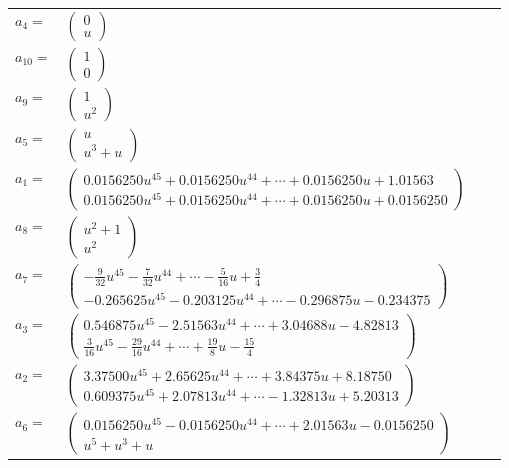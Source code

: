 \documentclass[1p]{elsarticle_modified}
\theoremstyle{definition}
\begin{document}
\begin{tabular}{m{7pt} m{180pt} m{7pt} m{180pt} }
\flushright $a_{4}=$&$\begin{pmatrix}0\\u\end{pmatrix}$ \\
\flushright $a_{10}=$&$\begin{pmatrix}1\\0\end{pmatrix}$ \\
\flushright $a_{9}=$&$\begin{pmatrix}1\\u^2\end{pmatrix}$ \\
\flushright $a_{5}=$&$\begin{pmatrix}u\\u^3+u\end{pmatrix}$ \\
\flushright $a_{1}=$&$\begin{pmatrix}0.0156250 u^{45}+0.0156250 u^{44}+\cdots+0.0156250 u+1.01563\\0.0156250 u^{45}+0.0156250 u^{44}+\cdots+0.0156250 u+0.0156250\end{pmatrix}$ \\
\flushright $a_{8}=$&$\begin{pmatrix}u^2+1\\u^2\end{pmatrix}$ \\
\flushright $a_{7}=$&$\begin{pmatrix}-\frac{9}{32} u^{45}-\frac{7}{32} u^{44}+\cdots-\frac{5}{16} u+\frac{3}{4}\\-0.265625 u^{45}-0.203125 u^{44}+\cdots-0.296875 u-0.234375\end{pmatrix}$ \\
\flushright $a_{3}=$&$\begin{pmatrix}0.546875 u^{45}-2.51563 u^{44}+\cdots+3.04688 u-4.82813\\\frac{3}{16} u^{45}-\frac{29}{16} u^{44}+\cdots+\frac{19}{8} u-\frac{15}{4}\end{pmatrix}$ \\
\flushright $a_{2}=$&$\begin{pmatrix}3.37500 u^{45}+2.65625 u^{44}+\cdots+3.84375 u+8.18750\\0.609375 u^{45}+2.07813 u^{44}+\cdots-1.32813 u+5.20313\end{pmatrix}$ \\
\flushright $a_{6}=$&$\begin{pmatrix}0.0156250 u^{45}-0.0156250 u^{44}+\cdots+2.01563 u-0.0156250\\u^5+u^3+u\end{pmatrix}$ \\

\end{tabular}
\end{document}
